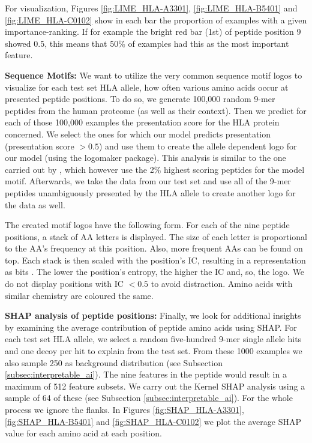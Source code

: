 \documentclass[msc,deptreport,ai]{infthesis} %
\newcommand{\HLAalleleI}{HLA-A3301}
\newcommand{\HLAalleleII}{HLA-B5401}
\newcommand{\HLAalleleIII}{HLA-C0102}
\begin{document}
			For visualization, Figures \ref{fig:LIME_\HLAalleleI}, \ref{fig:LIME_\HLAalleleII} and \ref{fig:LIME_\HLAalleleIII} show in each bar the proportion of examples with a given importance-ranking. If for example the bright red bar (1st) of peptide position 9 showed 0.5, this means that 50\% of examples had this as the most important feature.
		
			\noindent \textbf{Sequence Motifs:} We want to utilize the very common sequence motif logos \cite{schneider_sequence_1990} to visualize for each test set \gls{HLA} allele, how often various amino acids occur at presented peptide positions. To do so, we generate 100,000 random 9-mer peptides from the human proteome (as well as their context). Then we predict for each of those 100,000 examples the presentation score for the \gls{HLA} protein concerned. We select the ones for which our model predicts presentation (presentation score $> 0.5$) and use them to create the allele dependent logo for our model (using the logomaker \cite{tareen_logomaker_2019} package). This analysis is similar to the one carried out by \cite{wu_deephlapan_2019}, which however use the 2\%  highest scoring peptides for the  model motif. Afterwards, we take the data from our test set and use all of the 9-mer peptides unambiguously presented by the \gls{HLA} allele to create another logo for the data as well.
			
			The created motif logos have the following form. For each of the nine peptide positions, a stack of \gls{AA} letters is displayed. The size of each letter is proportional to the \gls{AA}'s frequency at this position. Also, more frequent \glspl{AA} can be found on top. Each stack is then scaled with the position's \gls{IC}, resulting in a representation as bits \cite{schneider_sequence_1990}. The lower the position's entropy, the higher the \gls{IC} and, so, the logo. We do not display positions with \gls{IC} $< 0.5$ to avoid distraction. Amino acids with similar chemistry are coloured the same. 
			
			\noindent \textbf{SHAP analysis of peptide positions:} Finally, we look for additional insights by examining the average contribution of peptide amino acids using \gls{SHAP}. For each test set \gls{HLA} allele, we select a random five-hundred 9-mer single allele hits and one decoy per hit to explain from the test set. From these 1000 examples we also sample 250 as background distribution (see Subsection \ref{subsec:interpretable_ai}). The nine features in the peptide would result in a maximum of 512 feature subsets. We carry out the Kernel \gls{SHAP} analysis using a sample of 64 of these (see Subsection \ref{subsec:interpretable_ai}). For the whole process we ignore the flanks. In Figures \ref{fig:SHAP_\HLAalleleI}, \ref{fig:SHAP_\HLAalleleII} and \ref{fig:SHAP_\HLAalleleIII} we plot the average \gls{SHAP} value for each amino acid at each position.			
\end{document}
